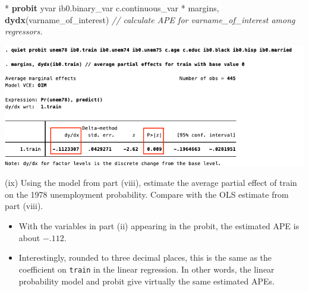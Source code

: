 \documentclass[
  10pt,
  ignorenonframetext,
]{beamer}
\newenvironment{Shaded}{\begin{snugshade}}{\end{snugshade}}
\newcommand{\CommentTok}[1]{\textcolor[rgb]{0.56,0.35,0.01}{\textit{#1}}}
\newcommand{\KeywordTok}[1]{\textcolor[rgb]{0.13,0.29,0.53}{\textbf{#1}}}
\newcommand{\NormalTok}[1]{#1}
\providecommand{\tightlist}{%
  \setlength{\itemsep}{0pt}\setlength{\parskip}{0pt}}
\begin{document}
\begin{frame}[fragile]{}
\protect\hypertarget{section}{}
\small

\begin{Shaded}
\begin{Highlighting}[]
\NormalTok{* }\KeywordTok{probit}\NormalTok{ yvar ib0.binary\_var c.continuous\_var}
\NormalTok{* margins, }\KeywordTok{dydx}\NormalTok{(varname\_of\_interest)}
\CommentTok{// calculate APE for varname\_of\_interest among regressors.}
\end{Highlighting}
\end{Shaded}

\begin{center}\includegraphics[width=1\linewidth]{pictures/PROBITtrainAPE} \end{center}
\end{frame}

\begin{frame}[fragile]{(ix) Using the model from part (viii), estimate
the average partial effect of train on the 1978 unemployment
probability. Compare with the OLS estimate from part (viii).}
\protect\hypertarget{ix-using-the-model-from-part-viii-estimate-the-average-partial-effect-of-train-on-the-1978-unemployment-probability.-compare-with-the-ols-estimate-from-part-viii.}{}
\begin{itemize}
\tightlist
\item
  With the variables in part (ii) appearing in the probit, the estimated
  APE is about \(-.112\).
\end{itemize}

\vspace{2mm}

\begin{itemize}
\tightlist
\item
  Interestingly, rounded to three decimal places, this is the same as
  the coefficient on \texttt{train} in the linear regression. In other
  words, the linear probability model and probit give virtually the same
  estimated APEs.
\end{itemize}
\end{frame}
\end{document}

